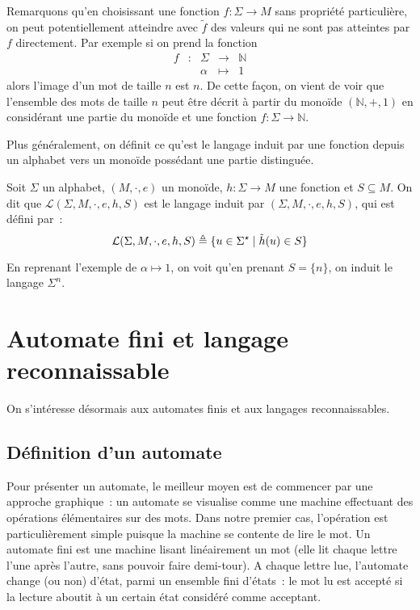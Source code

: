Remarquons qu'en choisissant une fonction $f : \Sigma \to M$ sans propriété
particulière, on peut potentiellement atteindre avec $\tilde f$ des valeurs qui
ne sont pas atteintes par $f$ directement. Par exemple si on prend la fonction
\[\begin{array}{ccccc}
f & : & \Sigma & \longrightarrow & \mathbb N\\
& & \alpha & \longmapsto & 1
\end{array}\]
alors l'image d'un mot de taille $n$ est $n$. De cette façon, on vient de voir
que l'ensemble des mots de taille $n$ peut être décrit à partir du monoïde
$(\mathbb N,+,1)$ en considérant une partie du monoïde et une fonction
$f : \Sigma \to \mathbb N$.

Plus généralement, on définit ce qu'est le langage induit par une fonction
depuis un alphabet vers un monoïde possédant une partie distinguée.

\begin{definition}
  Soit $\Sigma$ un alphabet, $(M,\cdot,e)$ un monoïde, $h : \Sigma \to M$ une
  fonction et $S\subseteq M$. On dit que $\mathcal L(\Sigma,M,\cdot,e,h,S)$ est
  le langage induit par $(\Sigma,M,\cdot,e,h,S)$, qui est défini par~:
  \[\mathcal L(\Sigma,M,\cdot,e,h,S)\triangleq
  \{u\in\Sigma^\star\mid \tilde h(u)\in S\}\]
\end{definition}

En reprenant l'exemple de $\alpha \mapsto 1$, on voit qu'en prenant $S = \{n\}$,
on induit le langage $\Sigma^n$.

\section{Automate fini et langage reconnaissable}

On s'intéresse désormais aux automates finis et aux langages reconnaissables.

\subsection{Définition d'un automate}

Pour présenter un automate, le meilleur moyen est de commencer par une approche
graphique~: un automate se visualise comme une machine effectuant des opérations
élémentaires sur des mots. Dans notre premier cas, l'opération est
particulièrement simple puisque la machine se contente de lire le mot. Un
automate fini est une machine lisant linéairement un mot (elle lit chaque lettre
l'une après l'autre, sans pouvoir faire demi-tour). A chaque lettre lue,
l'automate change (ou non) d'état, parmi un ensemble fini d'états~: le mot lu
est accepté si la lecture aboutit à un certain état considéré comme acceptant.

